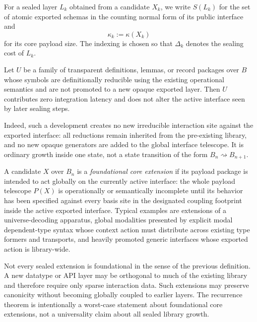 \documentclass{lmcs}
\begin{document}
For a sealed layer \(L_k\) obtained from a candidate \(X_k\), we write \(S(L_k)\) for the set
of atomic exported schemas in the counting normal form of its public interface and
\[
  \kappa_k := \kappa(X_k)
\]
for its core payload size.  The indexing is chosen so that \(\Delta_k\) denotes the sealing cost
of \(L_k\).

\begin{prop}
Let \(U\) be a family of transparent definitions, lemmas, or record packages over \(B\) whose
symbols are definitionally reducible using the existing operational semantics and are not
promoted to a new opaque exported layer.  Then \(U\) contributes zero integration latency and
does not alter the active interface seen by later sealing steps.
\end{prop}
Indeed, such a development creates no new irreducible interaction site against the exported
interface: all reductions remain inherited from the pre-existing library, and no new opaque
generators are added to the global interface telescope.  It is ordinary growth inside one
state, not a state transition of the form \(B_n\rightsquigarrow B_{n+1}\).

\begin{defi}
A candidate \(X\) over \(B_n\) is a \emph{foundational core extension} if its payload package is
intended to act globally on the currently active interface: the whole payload telescope
\(P(X)\) is operationally or semantically incomplete until its behavior has been specified
against every basis site in the designated coupling footprint inside the active exported
interface.  Typical examples are extensions of a universe-decoding apparatus, global
modalities presented by explicit modal dependent-type syntax whose context action must
distribute across existing type formers and transports, and heavily promoted generic
interfaces whose exported action is library-wide.
\end{defi}

\begin{rem}
Not every sealed extension is foundational in the sense of the previous definition.  A new
datatype or API layer may be orthogonal to much of the existing library and therefore require
only sparse interaction data.  Such extensions may preserve canonicity without becoming
globally coupled to earlier layers.  The recurrence theorem is intentionally a worst-case
statement about foundational core extensions, not a universality claim about all sealed
library growth.
\end{rem}
\end{document}
